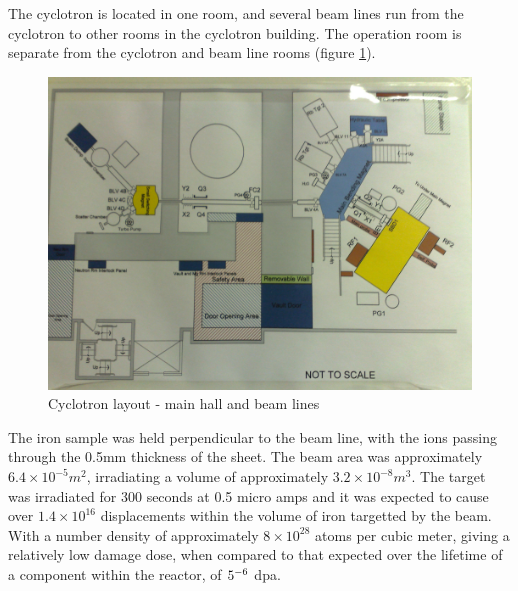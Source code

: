 The cyclotron is located in one room, and several beam lines run from the cyclotron to other rooms in the cyclotron building.  The operation room is separate from the cyclotron and beam line rooms (figure \ref{fig:cyclotronlayout}).

\begin{figure}[htp]
  \begin{center}
    \includegraphics[scale=0.7]{chapters/activity_code/images/cyclotron_layout.png}
    \caption{Cyclotron layout - main hall and beam lines}
    \label{fig:cyclotronlayout}
  \end{center}
\end{figure}

The iron sample was held perpendicular to the beam line, with the ions passing through the 0.5mm thickness of the sheet.  The beam area was approximately $6.4 \times 10^{-5} m^2$, irradiating a volume of approximately $3.2 \times 10^{-8} m^3$.  The target was irradiated for 300 seconds at 0.5 micro amps and it was expected to cause over $1.4 \times 10^{16}$ displacements within the volume of iron targetted by the beam.  With a number density of approximately $8\times10^{28}$ atoms per cubic meter, giving a relatively low damage dose, when compared to that expected over the lifetime of a component within the reactor, of $5 \time 10^{-6}$ \acrshort{dpa}.


